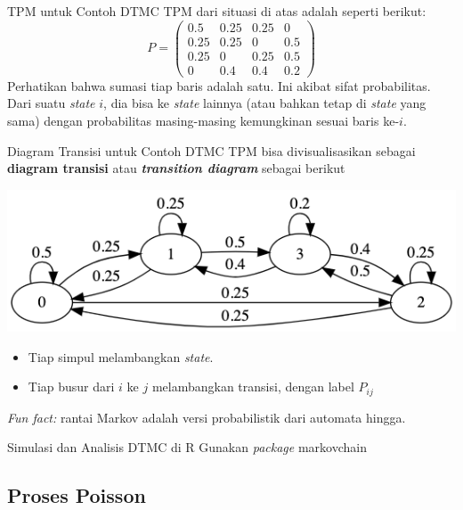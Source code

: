 \documentclass{beamer}
\begin{document}
\begin{frame}{TPM untuk Contoh DTMC}
    TPM dari situasi di atas adalah seperti berikut:
    \[ P = \begin{pmatrix}
        0.5 & 0.25 & 0.25 & 0 \\
        0.25 & 0.25 & 0 & 0.5 \\
        0.25 & 0 & 0.25 & 0.5 \\
        0 & 0.4 & 0.4 & 0.2
    \end{pmatrix} \]
    Perhatikan bahwa sumasi tiap baris adalah satu. Ini akibat sifat probabilitas. Dari suatu \textit{state} \(i\), dia bisa ke \textit{state} lainnya (atau bahkan tetap di \textit{state} yang sama) dengan probabilitas masing-masing kemungkinan sesuai baris ke-\(i\).
\end{frame}

\begin{frame}{Diagram Transisi untuk Contoh DTMC}
    TPM bisa divisualisasikan sebagai \textbf{diagram transisi} atau \textbf{\textit{transition diagram}} sebagai berikut

    \includegraphics[scale=0.5]{gambar/fig01_dtmc.png}

    \begin{itemize}
        \item Tiap simpul melambangkan \textit{state}.
        \item Tiap busur dari \(i\) ke \(j\) melambangkan transisi, dengan label \(P_{ij}\)
    \end{itemize}
    \textit{Fun fact:} rantai Markov adalah versi probabilistik dari automata hingga.
\end{frame}

\begin{frame}{Simulasi dan Analisis DTMC di R}
    Gunakan \textit{package} markovchain
\end{frame}

\subsection{Proses Poisson}
\end{document}
